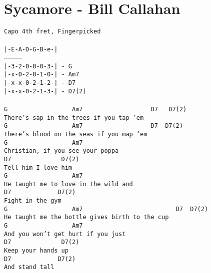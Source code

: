\newpage
\section{Sycamore - Bill Callahan}
\label{Sycamore - Bill Callahan}
\texttt{Capo\ 4th\ fret,\ Fingerpicked\\
\\
|-E-A-D-G-B-e-|\\
--------------- \\
|-3-2-0-0-0-3-|\ -\ G\\
|-x-0-2-0-1-0-|\ -\ Am7\\
|-x-x-0-2-1-2-|\ -\ D7\\
|-x-x-0-2-1-3-|\ -\ D7(2)\\
\\
G\ \ \ \ \ \ \ \ \ \ \ \ \ \ \ \ \ \ Am7\ \ \ \ \ \ \ \ \ \ \ \ \ \ \ \ \ \ \ D7\ \ \ D7(2)\\
There's\ sap\ in\ the\ trees\ if\ you\ tap\ 'em\\
G\ \ \ \ \ \ \ \ \ \ \ \ \ \ \ \ \ \ Am7\ \ \ \ \ \ \ \ \ \ \ \ \ \ \ \ \ \ \ D7\ \ D7(2)\\
There's\ blood\ on\ the\ seas\ if\ you\ map\ 'em\\
G\ \ \ \ \ \ \ \ \ \ \ \ \ \ \ \ \ \ Am7\ \ \ \ \ \ \ \ \ \ \ \ \\
Christian,\ if\ you\ see\ your\ poppa\\
D7\ \ \ \ \ \ \ \ \ \ \ \ \ \ D7(2)\ \ \ \\
Tell\ him\ I\ love\ him\\
G\ \ \ \ \ \ \ \ \ \ \ \ \ \ \ \ \ \ Am7\\
He\ taught\ me\ to\ love\ in\ the\ wild\ and\\
D7\ \ \ \ \ \ \ \ \ \ \ \ \ D7(2)\ \ \ \ \\
Fight\ in\ the\ gym\\
G\ \ \ \ \ \ \ \ \ \ \ \ \ \ \ \ \ \ Am7\ \ \ \ \ \ \ \ \ \ \ \ \ \ \ \ \ \ \ \ \ \ \ \ \ \ D7\ \ D7(2)\\
He\ taught\ me\ the\ bottle\ gives\ birth\ to\ the\ cup\\
G\ \ \ \ \ \ \ \ \ \ \ \ \ \ \ \ \ \ Am7\ \ \ \ \ \ \ \ \ \ \ \ \ \ \ \\
And\ you\ won't\ get\ hurt\ if\ you\ just\\
D7\ \ \ \ \ \ \ \ \ \ \ \ \ \ D7(2)\ \ \ \\
Keep\ your\ hands\ up\\
D7\ \ \ \ \ \ \ \ \ \ \ \ \ D7(2)\\
And\ stand\ tall\\
}
